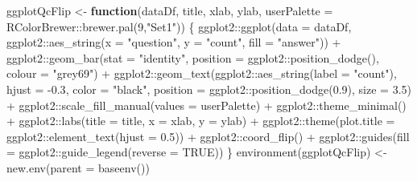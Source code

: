 \documentclass[
]{article}
\newenvironment{Shaded}{\begin{snugshade}}{\end{snugshade}}
\newcommand{\AttributeTok}[1]{\textcolor[rgb]{0.77,0.63,0.00}{#1}}
\newcommand{\ConstantTok}[1]{\textcolor[rgb]{0.00,0.00,0.00}{#1}}
\newcommand{\ControlFlowTok}[1]{\textcolor[rgb]{0.13,0.29,0.53}{\textbf{#1}}}
\newcommand{\DecValTok}[1]{\textcolor[rgb]{0.00,0.00,0.81}{#1}}
\newcommand{\FloatTok}[1]{\textcolor[rgb]{0.00,0.00,0.81}{#1}}
\newcommand{\FunctionTok}[1]{\textcolor[rgb]{0.00,0.00,0.00}{#1}}
\newcommand{\NormalTok}[1]{#1}
\newcommand{\OtherTok}[1]{\textcolor[rgb]{0.56,0.35,0.01}{#1}}
\newcommand{\SpecialCharTok}[1]{\textcolor[rgb]{0.00,0.00,0.00}{#1}}
\newcommand{\StringTok}[1]{\textcolor[rgb]{0.31,0.60,0.02}{#1}}
\begin{document}
\begin{Shaded}
\begin{Highlighting}[]
\NormalTok{ggplotQcFlip }\OtherTok{\textless{}{-}} \ControlFlowTok{function}\NormalTok{(dataDf, title, xlab, ylab, }\AttributeTok{userPalette =}\NormalTok{ RColorBrewer}\SpecialCharTok{::}\FunctionTok{brewer.pal}\NormalTok{(}\DecValTok{9}\NormalTok{,}\StringTok{"Set1"}\NormalTok{)) \{}
\NormalTok{  ggplot2}\SpecialCharTok{::}\FunctionTok{ggplot}\NormalTok{(}\AttributeTok{data =}\NormalTok{ dataDf, ggplot2}\SpecialCharTok{::}\FunctionTok{aes\_string}\NormalTok{(}\AttributeTok{x =} \StringTok{"question"}\NormalTok{, }\AttributeTok{y =} \StringTok{"count"}\NormalTok{, }\AttributeTok{fill =} \StringTok{"answer"}\NormalTok{)) }\SpecialCharTok{+} 
\NormalTok{    ggplot2}\SpecialCharTok{::}\FunctionTok{geom\_bar}\NormalTok{(}\AttributeTok{stat =} \StringTok{"identity"}\NormalTok{, }\AttributeTok{position =}\NormalTok{ ggplot2}\SpecialCharTok{::}\FunctionTok{position\_dodge}\NormalTok{(), }\AttributeTok{colour =} \StringTok{"grey69"}\NormalTok{) }\SpecialCharTok{+}
\NormalTok{    ggplot2}\SpecialCharTok{::}\FunctionTok{geom\_text}\NormalTok{(ggplot2}\SpecialCharTok{::}\FunctionTok{aes\_string}\NormalTok{(}\AttributeTok{label =} \StringTok{"count"}\NormalTok{), }\AttributeTok{hjust =} \SpecialCharTok{{-}}\FloatTok{0.3}\NormalTok{, }\AttributeTok{color =} \StringTok{"black"}\NormalTok{, }
                       \AttributeTok{position =}\NormalTok{ ggplot2}\SpecialCharTok{::}\FunctionTok{position\_dodge}\NormalTok{(}\FloatTok{0.9}\NormalTok{), }\AttributeTok{size =} \FloatTok{3.5}\NormalTok{) }\SpecialCharTok{+}
\NormalTok{    ggplot2}\SpecialCharTok{::}\FunctionTok{scale\_fill\_manual}\NormalTok{(}\AttributeTok{values =}\NormalTok{ userPalette) }\SpecialCharTok{+}
\NormalTok{    ggplot2}\SpecialCharTok{::}\FunctionTok{theme\_minimal}\NormalTok{() }\SpecialCharTok{+}
\NormalTok{    ggplot2}\SpecialCharTok{::}\FunctionTok{labs}\NormalTok{(}\AttributeTok{title =}\NormalTok{ title, }\AttributeTok{x =}\NormalTok{ xlab, }\AttributeTok{y =}\NormalTok{ ylab) }\SpecialCharTok{+}
\NormalTok{    ggplot2}\SpecialCharTok{::}\FunctionTok{theme}\NormalTok{(}\AttributeTok{plot.title =}\NormalTok{ ggplot2}\SpecialCharTok{::}\FunctionTok{element\_text}\NormalTok{(}\AttributeTok{hjust =} \FloatTok{0.5}\NormalTok{)) }\SpecialCharTok{+}
\NormalTok{    ggplot2}\SpecialCharTok{::}\FunctionTok{coord\_flip}\NormalTok{() }\SpecialCharTok{+}
\NormalTok{    ggplot2}\SpecialCharTok{::}\FunctionTok{guides}\NormalTok{(}\AttributeTok{fill =}\NormalTok{ ggplot2}\SpecialCharTok{::}\FunctionTok{guide\_legend}\NormalTok{(}\AttributeTok{reverse =} \ConstantTok{TRUE}\NormalTok{)) }
\NormalTok{\}}
\FunctionTok{environment}\NormalTok{(ggplotQcFlip) }\OtherTok{\textless{}{-}} \FunctionTok{new.env}\NormalTok{(}\AttributeTok{parent =} \FunctionTok{baseenv}\NormalTok{())}


\end{Highlighting}
\end{Shaded}
\end{document}
